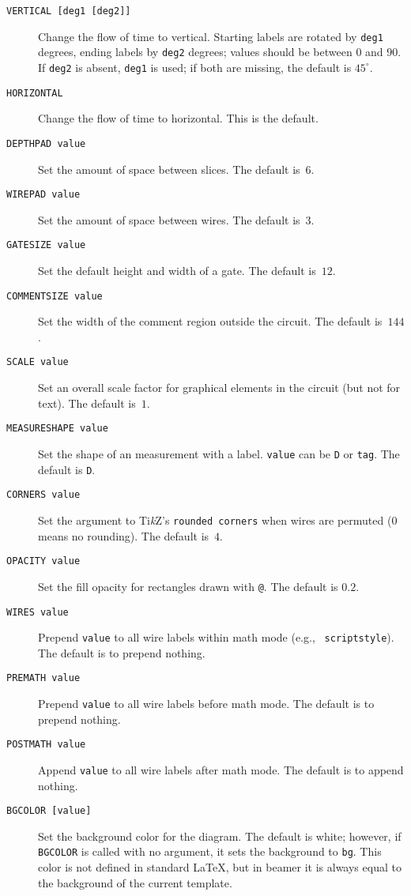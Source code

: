 \documentclass[twoside,12pt]{article}
\newcommand{\TikZ}{Ti\emph{k}Z\xspace}
\begin{document}
\begin{description}
\item[{\tt VERTICAL [deg1 [deg2]]}] Change the flow of time to vertical.  Starting labels are rotated by
{\tt deg1} degrees, ending labels by {\tt deg2} degrees; values should be between $0$ and $90$.  If {\tt deg2}
is absent, {\tt deg1} is used; if both are missing, the default is $45^\circ$.
\item[{\tt HORIZONTAL}] Change the flow of time to horizontal.  This is the default.
\item[{\tt DEPTHPAD value}] Set the amount of space between slices.  The default is~$6$.
\item[{\tt WIREPAD value}] Set the amount of space between wires.  The default is~$3$.
\item[{\tt GATESIZE value}] Set the default height and width of a gate.  The default is~$12$.
\item[{\tt COMMENTSIZE value}] Set the width of the comment region outside the circuit.  The default is~$144$.
\item[{\tt SCALE value}] Set an overall scale factor for graphical elements in the circuit (but not for text).
  The default is~$1$.
\item[{\tt MEASURESHAPE value}] Set the shape of an measurement with a label.  {\tt value}
  can be {\tt D} or {\tt tag}.  The default is {\tt D}.
\item[{\tt CORNERS value}] Set the argument to \TikZ's {\tt rounded corners} when wires
  are permuted ($0$ means no rounding).  The default is~$4$.
\item[{\tt OPACITY value}] Set the fill opacity for rectangles drawn with {\tt @}.
  The default is $0.2$.
\item[{\tt WIRES value}] Prepend {\tt value} to all wire labels within math mode (e.g., {\tt {} scriptstyle}).
The default is to prepend nothing.
\item[{\tt PREMATH value}] Prepend {\tt value} to all wire labels before math mode.  The default is to prepend nothing.
\item[{\tt POSTMATH value}] Append {\tt value} to all wire labels after math mode.  The default is to append nothing.
\item[{\tt BGCOLOR [value]}] Set the background color for the diagram.  The default is white; however, if {\tt BGCOLOR}
is called with no argument, it sets the background to {\tt bg}.  This color is not defined in standard {\LaTeX},
but in {\sc beamer} it is always equal to the background of the current template.

\end{description}
\end{document}
